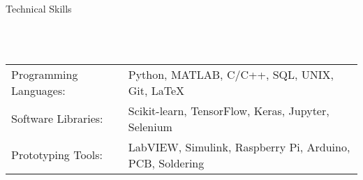 \documentclass{article}
\newcommand{\lineunder} {
    \vspace*{-8pt} \\
    \hspace*{-18pt} \hrulefill \\
}
\newcommand{\header} [1] {
    {\hspace*{-18pt}\vspace*{6pt} \Large{#1} }
    \vspace*{-6pt} 
    \lineunder
}
\begin{document}

%
\vspace{5mm}

\header{Technical Skills}
\vspace{1mm}
\begin{tabular}{ l l }
	Programming Languages: & Python, MATLAB, C/C++, SQL, UNIX, Git, \LaTeX \\
	Software Libraries:   & Scikit-learn, TensorFlow, Keras, Jupyter, Selenium\\
	Prototyping Tools:    & LabVIEW, Simulink, Raspberry Pi, Arduino, PCB, Soldering  \\
\end{tabular}
\vspace{5mm}


\end{document}
